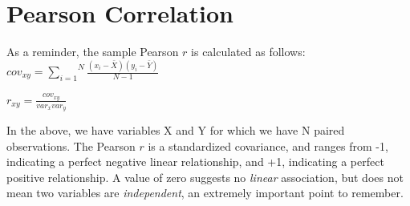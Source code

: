 \documentclass[english,nohyper,titlepage]{tufte-handout}\usepackage{graphicx, color}
\begin{document}
\section{Pearson Correlation}
As a reminder, the sample Pearson $r$ is calculated as follows: \\

\medskip
$cov_{xy} = \overset{N}{\underset{i=1}{\sum}}\frac{(x_i-\bar{X})(y_i-\bar{Y})}{N-1}$

\medskip
$r_{xy} = \frac{cov_{xy}}{var_xvar_y}$
\medskip

In the above, we have variables X and Y for which we have N paired observations. The Pearson $r$ is a standardized covariance, and ranges from -1, indicating a perfect negative linear relationship, and +1, indicating a perfect positive relationship.  A value of zero suggests no \emph{linear} association, but does not mean two variables are \emph{independent}, an extremely important point to remember.
\end{document}
